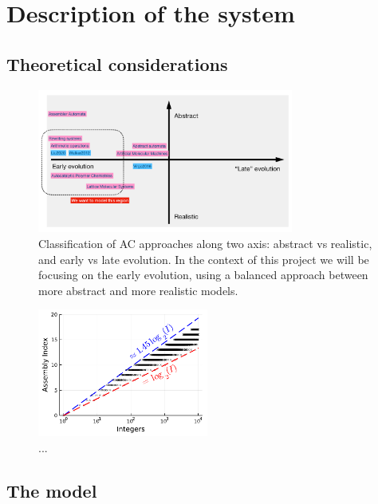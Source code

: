 \documentclass[11pt]{article}
\begin{document}
\tableofcontents
\clearpage

\section{Description of the system}

\subsection{Theoretical considerations}

\begin{figure}
  \centering
  \includegraphics[width=0.75\textwidth]{figures/system/abstraction-stage.pdf}
  \caption{Classification of AC approaches along two axis: abstract vs realistic, and early vs late evolution. In the context of this project we will be focusing on the early evolution, using a balanced approach between more abstract and more realistic models.}
\end{figure}

\begin{figure}
  \centering
  \includegraphics[width=0.50\textwidth]{figures/system/integers-assembly.pdf}
  \caption{...}
\end{figure}

\clearpage

\subsection{The model}
\end{document}
